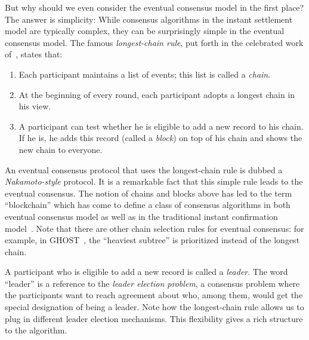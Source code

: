 But why should we even consider the eventual consensus model in the first place? 
The answer is simplicity: 
While consensus algorithms in the instant settlement model 
are typically complex, 
they can be surprisingly simple in the eventual consensus model. 
The famous \emph{longest-chain rule}, put forth in the 
celebrated work of~\citet{Nakamoto2008}, states that:
\begin{enumerate}
  \item Each participant maintains a list of events; 
  this list is called a \emph{chain}.

  \item At the beginning of every round, 
  each participant adopts a longest chain in his view.

  \item A participant can test whether he is eligible to add a new record to his chain. 
  If he is, he adds this record (called a \emph{block}) on top of his chain 
  and shows the new chain to everyone.
\end{enumerate}

An eventual consensus protocol that uses the longest-chain rule is dubbed a \emph{Nakamoto-style} protocol.
It is a remarkable fact that this simple rule leads to the eventual consensus. 
The notion of chains and blocks above has led to the term ``blockchain'' 
which has come to define a class of consensus algorithms 
in both eventual consensus model as well as in the traditional 
instant confirmation model~\cite{BlockchainAlgorithms}. 
Note that there are other chain selection rules for eventual consensus: 
for example, in GHOST~\cite{Ghost},
the ``heaviest subtree'' is prioritized instead of the longest chain. 

A participant who is eligible to add a new record is called a \emph{leader}. 
The word ``leader'' is a reference to the \emph{leader election problem}, 
a consensus problem where the participants want to 
reach agreement about who, among them, would get 
the special designation of being a leader.
Note how the longest-chain rule allows us to plug in 
different leader election mechanisms. 
This flexibility gives a rich structure to the algorithm.

